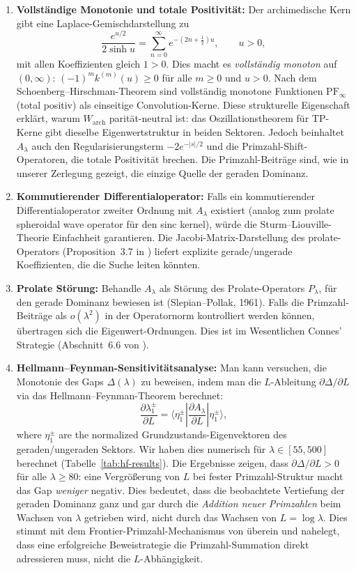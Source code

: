 \documentclass[12pt,a4paper]{article}
\theoremstyle{definition}
\theoremstyle{remark}
\begin{document}
\begin{enumerate}[label=(\Alph*)]
  \item \textbf{Vollständige Monotonie und totale Positivität:} Der archimedische Kern gibt eine Laplace-Gemischdarstellung zu
  \[ \frac{e^{u/2}}{2\sinh u} = \sum_{n=0}^\infty e^{-(2n+\frac{1}{2})u}, \qquad u > 0, \]
  mit allen Koeffizienten gleich $1 > 0$. Dies macht es \emph{vollständig monoton} auf $(0,\infty)$: $(-1)^m k^{(m)}(u) \geq 0$ für alle $m \geq 0$ und $u > 0$. Nach dem Schoenberg--Hirschman-Theorem sind vollständig monotone Funktionen $\mathrm{PF}_\infty$ (total positiv) als einseitige Convolution-Kerne. Diese strukturelle Eigenschaft erklärt, warum $W_{\mathrm{arch}}$ parität-neutral ist: das Oszillationstheorem für TP-Kerne gibt dieselbe Eigenwertstruktur in beiden Sektoren. Jedoch beinhaltet $A_\lambda$ auch den Regularisierungsterm $-2e^{-|s|/2}$ und die Primzahl-Shift-Operatoren, die totale Positivität brechen. Die Primzahl-Beiträge sind, wie in unserer Zerlegung gezeigt, die einzige Quelle der geraden Dominanz.

  \item \textbf{Kommutierender Differentialoperator:} Falls ein kommutierender Differentialoperator zweiter Ordnung mit $A_\lambda$ existiert (analog zum prolate spheroidal wave operator für den sinc kernel), würde die Sturm--Liouville-Theorie Einfachheit garantieren. Die Jacobi-Matrix-Darstellung des prolate-Operators (Proposition~3.7 in \cite{ConnesMoscovici2023}) liefert explizite gerade/ungerade Koeffizienten, die die Suche leiten könnten.

  \item \textbf{Prolate Störung:} Behandle $A_\lambda$ als Störung des Prolate-Operators $P_\lambda$, für den gerade Dominanz bewiesen ist (Slepian--Pollak, 1961). Falls die Primzahl-Beiträge als $o(\lambda^2)$ in der Operatornorm kontrolliert werden können, übertragen sich die Eigenwert-Ordnungen. Dies ist im Wesentlichen Connes' Strategie (Abschnitt~6.6 von \cite{Connes2025}).

  \item \textbf{Hellmann--Feynman-Sensitivitätsanalyse:} Man kann versuchen, die Monotonie des Gaps $\Delta(\lambda)$ zu beweisen, indem man die $L$-Ableitung $\partial\Delta/\partial L$ via das Hellmann--Feynman-Theorem berechnet:
  \[ \frac{\partial \lambda_1^\pm}{\partial L} = \langle \eta_1^\pm | \frac{\partial A_\lambda}{\partial L} | \eta_1^\pm \rangle, \]
  where $\eta_1^\pm$ are the normalized Grundzustands-Eigenvektoren des geraden/ungeraden Sektors.
  Wir haben dies numerisch für $\lambda \in [55, 500]$ berechnet (Tabelle~\ref{tab:hf-results}). Die Ergebnisse zeigen, dass $\partial\Delta/\partial L > 0$ für alle $\lambda \geq 80$: eine Vergrößerung von $L$ bei fester Primzahl-Struktur macht das Gap \emph{weniger} negativ. Dies bedeutet, dass die beobachtete Vertiefung der geraden Dominanz ganz und gar durch die \emph{Addition neuer Primzahlen} beim Wachsen von $\lambda$ getrieben wird, nicht durch das Wachsen von $L = \log\lambda$. Dies stimmt mit dem Frontier-Primzahl-Mechanismus von  überein und nahelegt, dass eine erfolgreiche Beweistrategie die Primzahl-Summation direkt adressieren muss, nicht die $L$-Abhängigkeit.
\end{enumerate}
\end{document}
